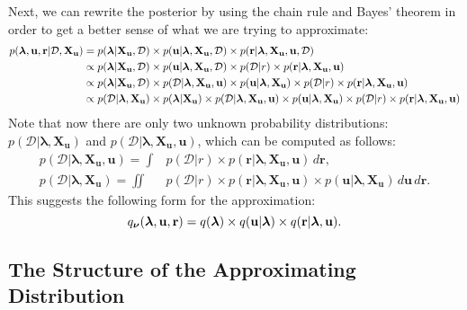 \documentclass{mprop}
\theoremstyle{definition}
\begin{document}
Next, we can rewrite the posterior by using the chain rule and Bayes' theorem in
order to get a better sense of what we are trying to approximate:
\[
  \begin{split}
    p(\bm\lambda, \mathbf{u}, \mathbf{r} | \mathcal{D}, \mathbf{X_u}) &= p(\bm\lambda | \mathbf{X_u}, \mathcal{D}) \times p(\mathbf{u}
    | \bm\lambda, \mathbf{X_u}, \mathcal{D}) \times p(\mathbf{r} | \bm\lambda,
    \mathbf{X_u}, \mathbf{u}, \mathcal{D}) \\
    &\propto p(\bm\lambda | \mathbf{X_u}, \mathcal{D}) \times p(\mathbf{u} |
    \bm\lambda, \mathbf{X_u}, \mathcal{D}) \times p(\mathcal{D} | r) \times
    p(\mathbf{r} | \bm\lambda, \mathbf{X_u}, \mathbf{u}) \\
    &\propto p(\bm\lambda | \mathbf{X_u}, \mathcal{D}) \times p(\mathcal{D} |
    \bm\lambda, \mathbf{X_u}, \mathbf{u}) \times p(\mathbf{u} | \bm\lambda,
    \mathbf{X_u}) \times p(\mathcal{D} | r) \times p(\mathbf{r} | \bm\lambda,
    \mathbf{X_u}, \mathbf{u}) \\
    &\propto p(\mathcal{D} | \bm\lambda, \mathbf{X_u}) \times p(\bm\lambda |
    \mathbf{X_u}) \times p(\mathcal{D} | \bm\lambda, \mathbf{X_u}, \mathbf{u})
    \times p(\mathbf{u} | \bm\lambda, \mathbf{X_u}) \times p(\mathcal{D} | r)
    \times p(\mathbf{r} | \bm\lambda, \mathbf{X_u}, \mathbf{u})
  \end{split}
\]
Note that now there are only two unknown probability distributions:
$p(\mathcal{D} | \bm\lambda, \mathbf{X_u})$ and $p(\mathcal{D} | \bm\lambda,
\mathbf{X_u}, \mathbf{u})$, which can be computed as follows:
\begin{align*}
  p(\mathcal{D} | \bm\lambda, \mathbf{X_u}, \mathbf{u}) = \int &p(\mathcal{D} | r) \times p(\mathbf{r} | \bm\lambda, \mathbf{X_u}, \mathbf{u}) \, d\mathbf{r}, \\
  p(\mathcal{D} | \bm\lambda, \mathbf{X_u}) = \iint &p(\mathcal{D} | r) \times p(\mathbf{r} | \bm\lambda, \mathbf{X_u}, \mathbf{u}) \times p(\mathbf{u} | \bm\lambda, \mathbf{X_u}) \, d\mathbf{u} \, d\mathbf{r}.
\end{align*}
This suggests the following form for the approximation:
\begin{equation} \label{eq:approximation}
  q_{\bm\nu}(\bm\lambda, \mathbf{u}, \mathbf{r}) = q(\bm\lambda) \times q(\mathbf{u} | \bm\lambda) \times q(\mathbf{r}
  | \bm\lambda, \mathbf{u}).
\end{equation}

\subsection{The Structure of the Approximating Distribution}
\end{document}
